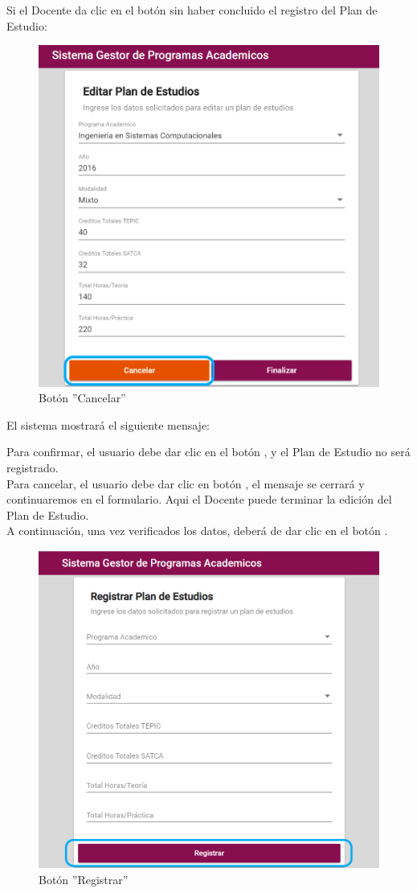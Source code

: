 \newpage
Si el Docente  da clic en el botón  sin haber concluido el registro del Plan de Estudio:

\begin{figure}[!hbtp]
	\centering
	\hypertarget{cancel2}{\includegraphics[width=0.7\linewidth]{images/SP4-GPE/cancelarPE}}
	\caption{Botón ''Cancelar''}
	\label{cancel2}
\end{figure}

El sistema mostrará el siguiente mensaje:

Para confirmar, el usuario debe dar clic en el botón  , y el Plan de Estudio no será registrado.\\

Para cancelar, el usuario debe dar clic en botón  , el mensaje se cerrará y continuaremos en el formulario. Aqui el Docente puede terminar la edición del Plan de Estudio.\\
\newpage
A continuación, una vez verificados los datos, deberá de dar clic en el botón .
\begin{figure}[!hbtp]
	\centering
	\hypertarget{btnreg}{\includegraphics[width=0.7\linewidth]{images/SP4-GPE/registrarB}}
	\caption{Botón ''Registrar''}
	\label{btnreg}
\end{figure}

